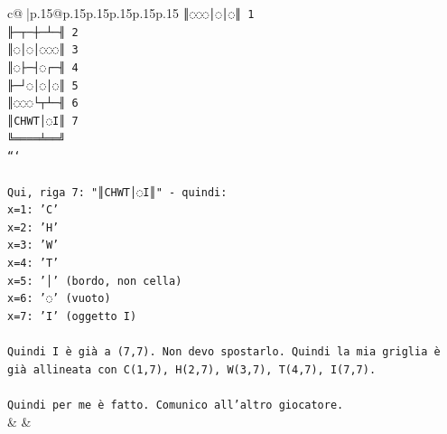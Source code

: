 \documentclass{article}
\begin{document}
{\begin{supertabular}{c@{$\;$}|p{.15\linewidth}@{}p{.15\linewidth}p{.15\linewidth}p{.15\linewidth}p{.15\linewidth}p{.15\linewidth}}
{{{\texttt{║◌◌◌│◌│◌║ 1} \\
\texttt{╟─┬─┼─┴─╢ 2} \\
\texttt{║◌│◌│◌◌◌║ 3} \\
\texttt{║◌├─┤◌┌─╢ 4} \\
\texttt{╟─┘◌│◌│◌║ 5} \\
\texttt{║◌◌◌└┬┴─╢ 6} \\
\texttt{║CHWT│◌I║ 7} \\
\texttt{╚════╧══╝} \\
\texttt{```} \\
\\ 
\texttt{Qui, riga 7: "║CHWT│◌I║" {-} quindi:} \\
\texttt{x=1: 'C'} \\
\texttt{x=2: 'H'} \\
\texttt{x=3: 'W'} \\
\texttt{x=4: 'T'} \\
\texttt{x=5: '│' (bordo, non cella)} \\
\texttt{x=6: '◌' (vuoto)} \\
\texttt{x=7: 'I' (oggetto I)} \\
\\ 
\texttt{Quindi I è già a (7,7). Non devo spostarlo. Quindi la mia griglia è già allineata con C(1,7), H(2,7), W(3,7), T(4,7), I(7,7).} \\
\\ 
\texttt{Quindi per me è fatto. Comunico all'altro giocatore.} \\
            }
        }
    }
    & & \\ \\


\end{supertabular}}
\end{document}
